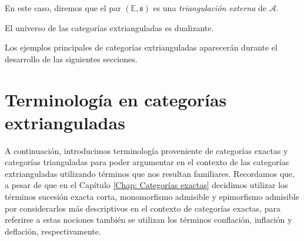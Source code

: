 \documentclass[tesis]{subfiles}
\begin{document}
\begin{Def}
    \noindent En este caso, diremos que el par $(\mathbb{E},\mathfrak{s})$ es una \emph{triangulación externa} de $\mathscr{A}$. 
\end{Def}

\begin{Obs}\label{Obs: Categorías extrianguladas}
    El universo de las categorías extrianguladas es dualizante.
\end{Obs}

Los ejemplos principales de categorías extrianguladas aparecerán durante el desarrollo de las siguientes secciones.

\section{Terminología en categorías extrianguladas} \label{Sec: Terminología en categorías extrianguladas}

A continuación, introducimos terminología proveniente de categorías exactas y categorías trianguladas para poder argumentar en el contexto de las categorías extrianguladas utilizando términos que nos resultan familiares. Recordamos que, a pesar de que en el Capítulo \ref{Chap: Categorías exactas} decidimos utilizar los términos sucesión exacta corta, monomorfismo admisible y epimorfismo admisible por considerarlos más descriptivos en el contexto de categorías exactas, para referirse a estas nociones también se utilizan los términos conflación, inflación y deflación, respectivamente.

\end{document}

